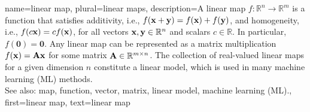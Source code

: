 {name={linear map}, plural={linear maps}, 
	description={A linear map $f: \mathbb{R}^n \rightarrow \mathbb{R}^m$ is a function that satisfies additivity, i.e.,
		$f({\bf x} + {\bf y}) = f({\bf x}) + f({\bf y})$, and homogeneity, i.e.,
		$f(c{\bf x}) = c f({\bf x})$, for all vectors ${\bf x}, {\bf y} \in \mathbb{R}^n$ and scalars $c \in \mathbb{R}$. 
		In particular, $f(\mathbf{0}) = \mathbf{0}$. Any linear map can be represented as a matrix 
		multiplication $f({\bf x}) = {\bf A} {\bf x}$ for some matrix ${\bf A} \in \mathbb{R}^{m \times n}$. 
		The collection of real-valued linear maps for a given dimension $n$ constitute a linear model, 
		which is used in many machine learning (ML) methods.
		\\
		See also: map, function, vector, matrix, linear model, machine learning (ML).},
	first={linear map},
	text={linear map}
}

